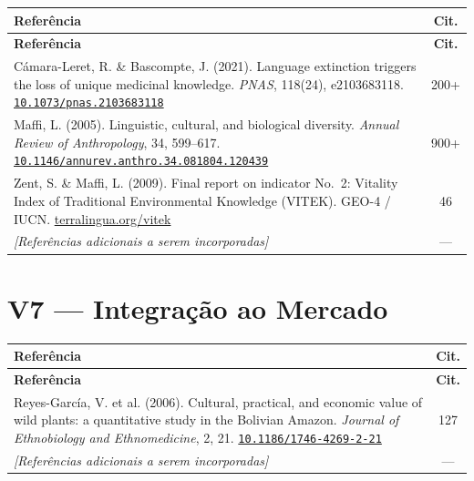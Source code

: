 \documentclass[a4paper,11pt]{article}
\newcommand{\doi}[1]{\href{https://doi.org/#1}{\texttt{#1}}}
\begin{document}
\begin{longtable}{>{\raggedright\arraybackslash}p{} c}
\toprule
\textbf{Referência} & \textbf{Cit.} \\
\midrule
\endfirsthead
\toprule
\textbf{Referência} & \textbf{Cit.} \\
\midrule
\endhead

Cámara-Leret, R. \& Bascompte, J. (2021). Language extinction triggers the loss of unique medicinal knowledge. \textit{PNAS}, 118(24), e2103683118.\newline
\doi{10.1073/pnas.2103683118} & 200+ \\
\addlinespace

Maffi, L. (2005). Linguistic, cultural, and biological diversity. \textit{Annual Review of Anthropology}, 34, 599--617.\newline
\doi{10.1146/annurev.anthro.34.081804.120439} & 900+ \\
\addlinespace

Zent, S. \& Maffi, L. (2009). Final report on indicator No.~2: Vitality Index of Traditional Environmental Knowledge (VITEK). GEO-4 / IUCN.\newline
\href{https://www.terralingua.org/vitek/}{terralingua.org/vitek} & 46 \\
\addlinespace

\textit{[Referências adicionais a serem incorporadas]} & --- \\

\bottomrule
\end{longtable}

\section{V7 --- Integração ao Mercado}

\begin{longtable}{>{\raggedright\arraybackslash}p{} c}
\toprule
\textbf{Referência} & \textbf{Cit.} \\
\midrule
\endfirsthead
\toprule
\textbf{Referência} & \textbf{Cit.} \\
\midrule
\endhead

Reyes-García, V. et al. (2006). Cultural, practical, and economic value of wild plants: a quantitative study in the Bolivian Amazon. \textit{Journal of Ethnobiology and Ethnomedicine}, 2, 21.\newline
\doi{10.1186/1746-4269-2-21} & 127 \\
\addlinespace

\textit{[Referências adicionais a serem incorporadas]} & --- \\

\bottomrule
\end{longtable}
\end{document}
